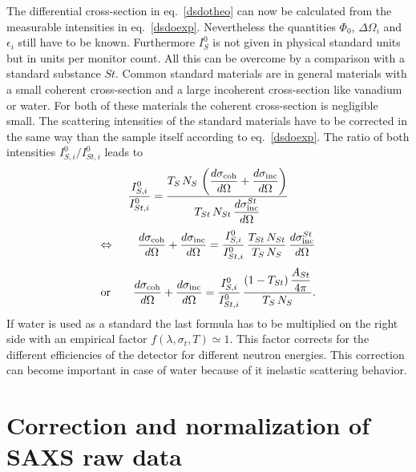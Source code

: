 The differential cross-section in eq.\ \ref{dsdotheo} can now be calculated from the measurable
intensities in eq.\ \ref{dsdoexp}. Nevertheless the quantities $\Phi_0$, $\Delta\Omega_i$ and
$\epsilon_i$ still have to be known. Furthermore $I_S^0$ is not given in physical standard units
but in units per monitor count. All this can be overcome by a comparison with a standard substance
$St$. Common standard materials are in general materials with a small coherent cross-section and a
large incoherent cross-section like vanadium or water. For both of these materials the coherent
cross-section is negligible small. The scattering intensities of the standard materials have to be
corrected in the same way than the sample itself according to eq.\ \ref{dsdoexp}. The ratio of both
intensities $I^0_{S,i}/I^0_{St,i}$ leads to
\begin{equation}
\frac{I^0_{S,i}}{I^0_{St,i}} = \frac{T_S\, N_S\, \displaystyle
\left(\frac{d\sigma_{\rm coh}}{d \Omega} +
\frac{d\sigma_{\rm inc}}{d\Omega} \right)}{T_{St}\,N_{St}\, \displaystyle
\frac{d\sigma^{St}_{\rm inc}}{d\Omega}}
\end{equation}
\begin{equation}
\Leftrightarrow \qquad \displaystyle
\frac{d\sigma_{\rm coh}}{d\Omega} + \frac{d\sigma_{\rm inc}}{d\Omega} =
\frac{I^0_{S,i}}{I^0_{St,i}} \, \frac{T_{St}\, N_{St}}{T_S\, N_S}\,
\displaystyle
\frac{d\sigma^{St}_{\rm inc}}{d\Omega}
\end{equation}
\begin{equation} \displaystyle
\mbox{or}\qquad
\frac{d\sigma_{\rm coh}}{d\Omega} + \frac{d\sigma_{\rm inc}}{d\Omega} =
\frac{I^0_{S,i}}{I^0_{St,i}} \, \frac{(1-T_{St})\, \displaystyle
\frac{A_{St}}{4\pi}}{T_S\, N_S} .
\end{equation}
If water is used as a standard the last formula has to be multiplied on the right
side with an empirical factor $f(\lambda,\sigma_t,T) \simeq 1$. This factor corrects for
the different efficiencies of the detector for different neutron energies. This correction
can become important in case of water because of it inelastic scattering behavior.

\section{Correction and normalization of SAXS raw data}
